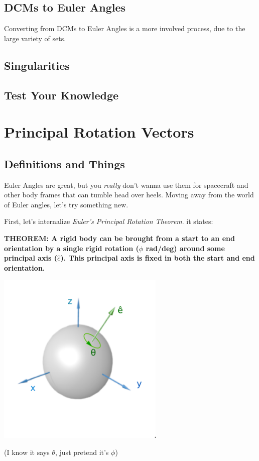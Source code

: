 \documentclass[a4paper,14pt]{extreport}
\begin{document}
\section{DCMs to Euler Angles}
Converting from DCMs to Euler Angles is a more involved process, due to the large variety of sets.
\section{Singularities}

\section{Test Your Knowledge}

\chapter{Principal Rotation Vectors}
\section{Definitions and Things}

Euler Angles are great, but you \emph{really} don't wanna use them for spacecraft and other body frames that can tumble head over heels. Moving away from the world of Euler angles, let's try something new. 

First, let's internalize \emph{Euler's Principal Rotation Theorem}. it states:

\begin{center}
\textbf{THEOREM: A rigid body can be brought from a start to an end orientation by a single rigid rotation ($\phi$ rad/deg) around some principal axis ($\hat{e}$). This principal axis is fixed in both the start and end orientation.}
\end{center}

\begin{center}
\includegraphics[width=8cm]{PRV1}

(I know it says $\theta$, just pretend it's $\phi$)
\end{center}
\end{document}

